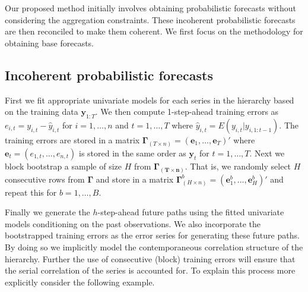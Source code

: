 \documentclass[12pt]{article}
\theoremstyle{definition}
\begin{document}
Our proposed method initially involves obtaining probabilistic forecasts without considering the aggregation constraints. These incoherent probabilistic forecasts are then reconciled to make them coherent. We first focus on the methodology for obtaining base forecasts.

\subsection{Incoherent probabilistic forecasts} \label{Subsec:Incoherent_samplePaths}
First we fit appropriate univariate models for each series in the hierarchy based on the training data $\bm{y}_{1:T}$. We then compute 1-step-ahead training errors as $e_{i,t} = y_{i,t} - \hat{y}_{i,t}$ for $i=1,\dots,n$ and $t = 1,\dots,T$ where $\hat{y}_{i,t} = E(y_{i,t}|y_{i,1:t-1})$. The training errors are stored in a matrix $\bm{\Gamma}_{(T \times n)} = (\bm{e}_1,\dots,\bm{e}_T)'$ where $\bm{e}_t = (e_{1,t},\dots,e_{n,t})$ is stored in the same order as $\bm{y}_t$ for $t=1,\dots,T$. Next we block bootstrap a sample of size $H$ from $\bm{\Gamma_{(T \times n)}}$. That is, we randomly select $H$ consecutive rows from $\bm{\Gamma}$ and store in a matrix $\bm{\Gamma}^b_{(H \times n)} = (\bm{e}^b_1,\dots,\bm{e}^b_H)'$ and repeat this for $b = 1,\dots,B$.

Finally we generate the $h$-step-ahead future paths using the fitted univariate models conditioning on the past observations. We also incorporate the bootstrapped training errors as the error series for generating these future paths. By doing so we implicitly model the contemporaneous correlation structure of the hierarchy. Further the use of consecutive (block) training errors will ensure that the serial correlation of the series is accounted for. To explain this process more explicitly consider the following example.
\end{document}
